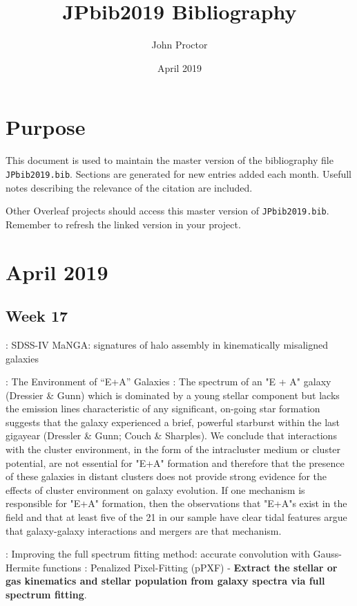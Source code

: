 \documentclass[ceqn,usenatbib,onecolumn]{mnras}
\title{JPbib2019 Bibliography}
\author{John Proctor}
\date{April 2019}
\begin{document}
\maketitle

\section{Purpose}
This document is used to maintain the master version of the bibliography file \texttt{JPbib2019.bib}. Sections are generated for new entries added each month. Usefull notes describing the relevance of the citation are included.
\par Other Overleaf projects should access this master version of \texttt{JPbib2019.bib}. Remember to refresh the linked version in your project.

\section{April 2019}
\subsection{Week 17}
\par \citet{2019MNRAS.483..172D} : {SDSS-IV MaNGA: signatures of halo assembly in kinematically misaligned galaxies}
\par \citet{1996ApJ...466..104Z} : {The Environment of ``E+A'' Galaxies} : The spectrum of an "E + A" galaxy (Dressier \& Gunn) which is dominated by a young stellar component but lacks the emission lines characteristic of any significant, on-going star formation suggests that the galaxy experienced a brief, powerful starburst within the last gigayear (Dressler \& Gunn; Couch \& Sharples). We conclude that interactions with the cluster environment, in the form of the intracluster medium or cluster potential, are not essential for "E+A" formation and therefore that the presence of these galaxies in distant clusters does not provide strong evidence for the effects of cluster environment on galaxy evolution. If one mechanism is responsible for "E+A" formation, then the observations that "E+A"s exist in the field and that at least five of the 21 in our sample have clear tidal features argue that galaxy-galaxy interactions and mergers are that mechanism. 
\par \citet{2017MNRAS.466..798C} : {Improving the full spectrum fitting method: accurate convolution with Gauss-Hermite functions} : Penalized Pixel-Fitting (pPXF) - \textbf{Extract the stellar or gas kinematics and stellar population from galaxy spectra via full spectrum fitting}.
\end{document}
